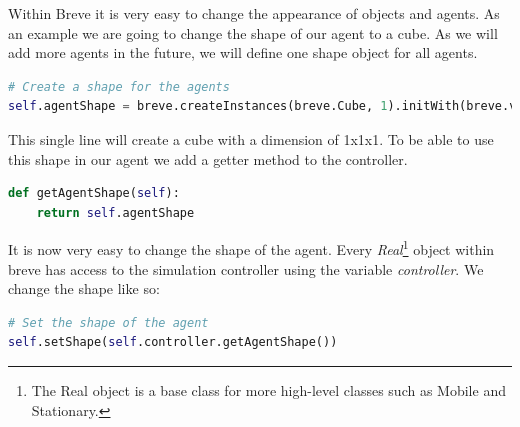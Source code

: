 Within Breve it is very easy to change the appearance of objects and agents. As an example we are going to change the shape of our agent to a cube. As we will add more agents in the future, we will define one shape object for all agents.

\begin{fullwidth}
\begin{lstlisting}[language=Python]
# Create a shape for the agents
self.agentShape = breve.createInstances(breve.Cube, 1).initWith(breve.vector(1,1,1))
\end{lstlisting}
\end{fullwidth}

This single line will create a cube with a dimension of 1x1x1. To be able to use this shape in our agent we add a getter method to the controller.

\begin{lstlisting}[language=Python]
def getAgentShape(self):
	return self.agentShape
\end{lstlisting}

It is now very easy to change the shape of the agent. Every \textit{Real}\footnote{The Real object is a base class for more high-level classes such as Mobile and Stationary.} object within breve has access to the simulation controller using the variable \textit{controller}. We change the shape like so:

\begin{lstlisting}[language=Python]
# Set the shape of the agent
self.setShape(self.controller.getAgentShape())
\end{lstlisting}

